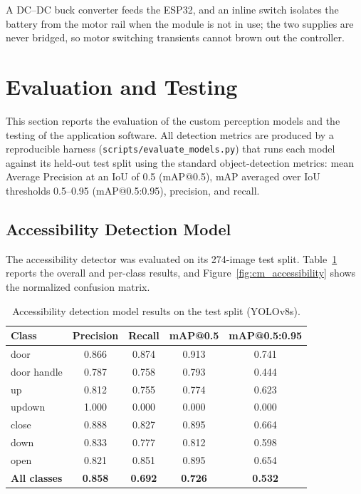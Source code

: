 A DC--DC buck converter feeds the ESP32, and an inline switch isolates the battery from the motor rail when the module is not in use; the two supplies are never bridged, so motor switching transients cannot brown out the controller.

\section{Evaluation and Testing}

This section reports the evaluation of the custom perception models and the testing of the application software. All detection metrics are produced by a reproducible harness (\texttt{scripts/evaluate\_models.py}) that runs each model against its held-out test split using the standard object-detection metrics: mean Average Precision at an IoU of 0.5 (mAP@0.5), mAP averaged over IoU thresholds 0.5--0.95 (mAP@0.5:0.95), precision, and recall.

\subsection{Accessibility Detection Model}

The accessibility detector was evaluated on its 274-image test split. Table~\ref{tab:acc_results} reports the overall and per-class results, and Figure~\ref{fig:cm_accessibility} shows the normalized confusion matrix.

\begin{table}[H]
\centering
\begin{tabular}{|l|c|c|c|c|}
\hline
\textbf{Class} & \textbf{Precision} & \textbf{Recall} & \textbf{mAP@0.5} & \textbf{mAP@0.5:0.95} \\
\hline
door & 0.866 & 0.874 & 0.913 & 0.741 \\
\hline
door handle & 0.787 & 0.758 & 0.793 & 0.444 \\
\hline
up & 0.812 & 0.755 & 0.774 & 0.623 \\
\hline
updown & 1.000 & 0.000 & 0.000 & 0.000 \\
\hline
close & 0.888 & 0.827 & 0.895 & 0.664 \\
\hline
down & 0.833 & 0.777 & 0.812 & 0.598 \\
\hline
open & 0.821 & 0.851 & 0.895 & 0.654 \\
\hline
\textbf{All classes} & \textbf{0.858} & \textbf{0.692} & \textbf{0.726} & \textbf{0.532} \\
\hline
\end{tabular}
\caption{Accessibility detection model results on the test split (YOLOv8s).}
\label{tab:acc_results}
\end{table}

